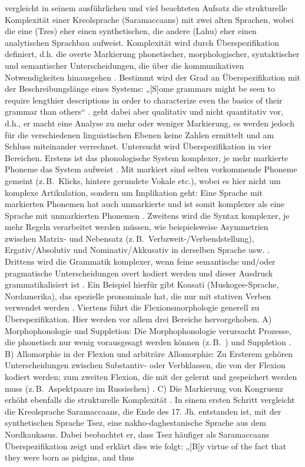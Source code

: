 \citet{McWhorter2001} vergleicht in seinem ausführlichen und viel beachteten Aufsatz die strukturelle Komplexität einer Kreolsprache (Saramaccaans) mit zwei alten Sprachen, wobei die eine (Tzes) eher einen synthetischen, die andere (Lahu) eher einen analytischen Sprachbau aufweist. Komplexität wird durch Überspezifikation definiert, d.h. die overte Markierung phonetischer, morphologischer, syntaktischer und semantischer Unterscheidungen, die über die kommunikativen Notwendigkeiten hinausgehen \citep[125]{McWhorter2001}. Bestimmt wird der Grad an Überspezifikation mit der Beschreibungslänge eines Systems: „[S]ome grammars might be seen to require lengthier descriptions in order to characterize even the basics of their grammar than others“ \citep[134--135]{McWhorter2001}. \citet{McWhorter2001} geht dabei aber qualitativ und nicht quantitativ vor, d.h., er macht eine Analyse zu mehr oder weniger Markierung, es werden jedoch für die verschiedenen linguistischen Ebenen keine Zahlen ermittelt und am Schluss miteinander verrechnet. Untersucht wird Überspezifikation in vier Bereichen. Erstens ist das phonologische System komplexer, je mehr markierte Phoneme das System aufweist \citep[135]{McWhorter2001}. Mit markiert sind selten vorkommende Phoneme gemeint (z.\,B.\ Klicks, hintere gerundete Vokale etc.), wobei es hier nicht um komplexe Artikulation, sondern um Implikation geht: Eine Sprache mit markierten Phonemen hat auch unmarkierte und ist somit komplexer als eine Sprache mit unmarkierten Phonemen \citep[135]{McWhorter2001}. Zweitens wird die Syntax komplexer, je mehr Regeln verarbeitet werden müssen, wie beispielsweise Asymmetrien zwischen Matrix- und Nebensatz (z.\,B.\ Verb\-zweit-/Verb\-end\-stel\-lung), Ergativ/Absolutiv und Nominativ/Akkusativ in derselben Sprache usw. \citep[136]{McWhorter2001}. Drittens wird die Grammatik komplexer, wenn feine semantische und/oder pragmatische Unterscheidungen overt kodiert werden und dieser Ausdruck grammatikalisiert ist \citep[136]{McWhorter2001}. Ein Beispiel hierfür gibt Koasati (Muskogee-Sprache, Nordamerika), das spezielle pronominale  hat, die nur mit stativen Verben verwendet werden \citep[137]{McWhorter2001}. Viertens führt die Flexionsmorphologie generell zu Überspezifikation. Hier werden vor allem drei Bereiche hervorgehoben. A) Morphophonologie und Suppletion: Die Morphophonologie verursacht Prozesse, die phonetisch nur wenig vorausgesagt werden können (z.\,B.\ ) und Suppletion \citep[137]{McWhorter2001}. B) Allomorphie in der Flexion und arbiträre Allomorphie: Zu Ersterem gehören Unterscheidungen zwischen Substantiv- oder Verbklassen, die von der Flexion kodiert werden; zum zweiten Flexion, die mit der  gelernt und gespeichert werden muss (z.\,B.\ Aspektpaare im Russischen) \citep[138]{McWhorter2001}. C) Die Markierung von Kongruenz erhöht ebenfalls die strukturelle Komplexität \citep[138]{McWhorter2001}. In einem ersten Schritt vergleicht \citet{McWhorter2001} die Kreolsprache Saramaccaans, die Ende des 17. Jh. entstanden ist, mit der synthetischen Sprache Tsez, eine nakho-daghestanische Sprache aus dem Nordkaukasus. Dabei beobachtet er, dass Tsez häufiger als Saramaccaans Überspezifikation zeigt und erklärt dies wie folgt: „[B]y virtue of the fact that they were born as pidgins, and thus 